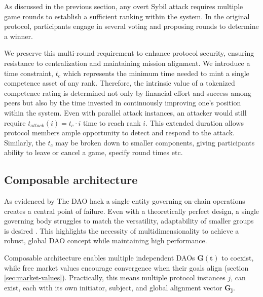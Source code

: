 \documentclass{article}
\begin{document}
\begin{CJK}{UTF8}{gbsn}
\begin{multicols}{2}
        As discussed in the previous section, any overt Sybil attack requires multiple game rounds to establish a sufficient ranking within the system. In the original protocol, participants engage in several voting and proposing rounds to determine a winner.

        We preserve this multi-round requirement to enhance protocol security, ensuring resistance to centralization and maintaining mission alignment. We introduce a time constraint,  $t_c$ which represents the minimum time needed to mint a single competence asset of any rank.
        Therefore, the intrinsic value of a tokenized competence rating is determined not only by financial effort and success among peers but also by the time invested in continuously improving one's position within the system. Even with parallel attack instances, an attacker would still require $t_{attack}(i) = t_c \cdot i$ time to reach rank $i$. This extended duration allows protocol members ample opportunity to detect and respond to the attack. Similarly, the $t_c$ may be broken down to smaller components, giving participants ability to leave or cancel a game, specify round times etc.


        \subsection{Composable architecture}

        As evidenced by The DAO hack\cite{Liu2021} a single entity governing on-chain operations creates a central point of failure. Even with a theoretically perfect design, a single governing body struggles to match the versatility, adaptability of smaller groups is desired \cite{Buterin22}.  This highlights the necessity of multidimensionality to achieve a robust, global DAO concept while maintaining high performance.


        Composable architecture enables multiple independent DAOs $\mathbf{G(t)}$ to coexist, while free market values encourage convergence when their goals align (section \ref{sec:market-values}). Practically, this means multiple protocol instances $j$, can exist, each with its own initiator, subject, and global alignment vector $\mathbf{G_j}$. \\


\end{multicols}
\end{CJK}
\end{document}
